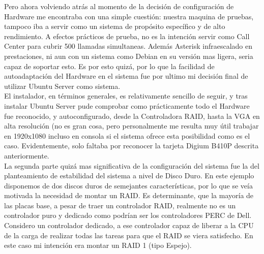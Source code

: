 Pero ahora volviendo atrás al momento de la decisión de configuración de Hardware me encontraba con una simple cuestión: nuestra maquina de pruebas, tampoco iba a servir como un sistema de propósito específico y de alto rendimiento. A efectos prácticos de prueba, no es la intención servir como Call Center para cubrir 500 llamadas simultaneas. Además Asterisk infraescalado en prestaciones, ni aun con un sistema como Debian en su versión mas ligera, seria capaz de soportar esto. Es por esto quizá, por lo que la facilidad de autoadaptación del Hardware en el sistema fue por ultimo mi decisión final de utilizar Ubuntu Server como sistema.\\

El instalador, en términos generales, es relativamente sencillo de seguir, y tras instalar Ubuntu Server pude comprobar como prácticamente todo el Hardware fue reconocido, y autoconfigurado, desde la Controladora RAID, hasta la VGA en alta resolución (no es gran cosa, pero personalmente me resulta muy útil trabajar en 1920x1080 incluso en consola si el sistema ofrece esta posibilidad como es el caso. Evidentemente, solo faltaba por reconocer la tarjeta Digium B410P descrita anteriormente.\\

La segunda parte quizá mas significativa de la configuración del sistema fue la del planteamiento de estabilidad del sistema a nivel de Disco Duro. En este ejemplo disponemos de dos discos duros de semejantes características, por lo que se veía motivada la necesidad de montar un RAID. Es determinante, que la mayoría de las placas base, a pesar de traer un controlador RAID, realmente no es un controlador puro y dedicado como podrían ser los controladores PERC de Dell. Considero un controlador dedicado, a ese controlador capaz de liberar a la CPU de la carga de realizar todas las tareas para que el RAID se viera satisfecho. En este caso mi intención era montar un RAID 1 (tipo Espejo).\\

